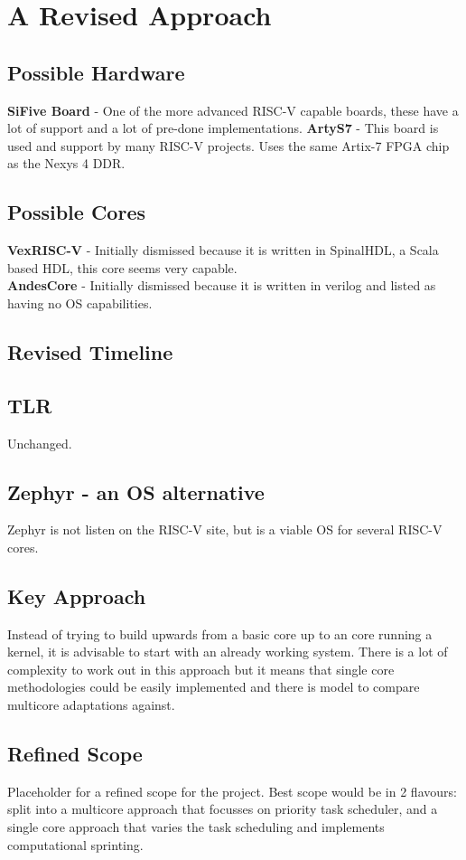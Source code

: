 	
\section{A Revised Approach}
	\subsection{Possible Hardware}
	\textbf{SiFive Board} - One of the more advanced RISC-V capable boards, these have a lot of support and a lot of pre-done implementations.
	\textbf{ArtyS7} - This board is used and support by many RISC-V projects. Uses the same Artix-7 FPGA chip as the Nexys 4 DDR.
	
	\subsection{Possible Cores}
	\textbf{VexRISC-V} - Initially dismissed because it is written in SpinalHDL, a Scala based HDL, this core seems very capable.\\
	\textbf{AndesCore} - Initially dismissed because it is written in verilog and listed as having no OS capabilities.
	
	\subsection{Revised Timeline}
	
	\subsection{TLR}
	Unchanged.
	
	\subsection{Zephyr - an OS alternative}
	Zephyr is not listen on the RISC-V site, but is a viable OS for several RISC-V cores.
	
	\subsection{Key Approach}
	Instead of trying to build upwards from a basic core up to an core running a kernel, it is advisable to start with an already working system. There is a lot of complexity to work out in this approach but it means that single core methodologies could be easily implemented and there is model to compare multicore adaptations against.
	
	\subsection{Refined Scope}
	Placeholder for a refined scope for the project. Best scope would be in 2 flavours: split into a multicore approach that focusses on priority task scheduler, and a single core approach that varies the task scheduling and implements computational sprinting. 
		


	
